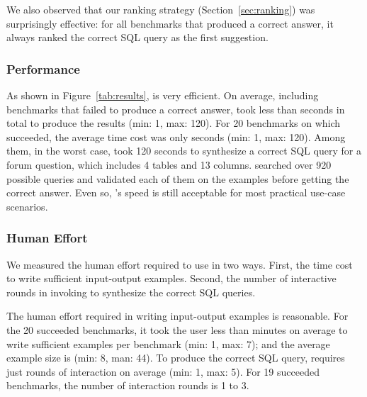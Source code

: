 We also observed that our ranking strategy (Section~\ref{sec:ranking})
was surprisingly effective: for all benchmarks that
\ourtool produced a correct answer, it always ranked the correct
SQL query as the first suggestion.

%

\subsubsection{Performance}
\label{sec:performance}

As shown in Figure~\ref{tab:results}, \ourtool
is very efficient.
On average,
including benchmarks that \ourtool failed to produce
a correct answer,
\ourtool took less than \avgtime seconds in total to
produce the results (min: 1, max: 120).
For 20 benchmarks on which \ourtool succeeded, the average
time cost was only \avgsucctime seconds (min: 1, max: 120). 
Among them, in the worst case, \ourtool took 120 seconds to synthesize a
correct SQL query for a forum question, which includes 4 tables
and 13 columns. \ourtool searched over 920 possible
queries and validated each of them on the examples before getting
the correct answer. Even so, \ourtool's speed is still acceptable
for most practical use-case scenarios.






\subsubsection{Human Effort}
\label{sec:human}

We measured the human effort required to use \ourtool in two ways.
First, the time cost to write sufficient input-output examples. Second,
the number of interactive rounds in invoking \ourtool
to synthesize the correct SQL queries.

The human effort required in writing
input-output examples is reasonable. For
the 20 succeeded benchmarks, it took the user less than
\avgsucchum minutes on average to write sufficient examples
per benchmark (min: 1, max: 7); and the
average example size is \avgsucctuple
(min: 8, man: 44).
To produce the correct SQL query,
\ourtool requires just \avgsuccround rounds of
interaction on average (min: 1, max: 5).
For 19 succeeded benchmarks, the number of interaction
rounds is 1 to 3.

